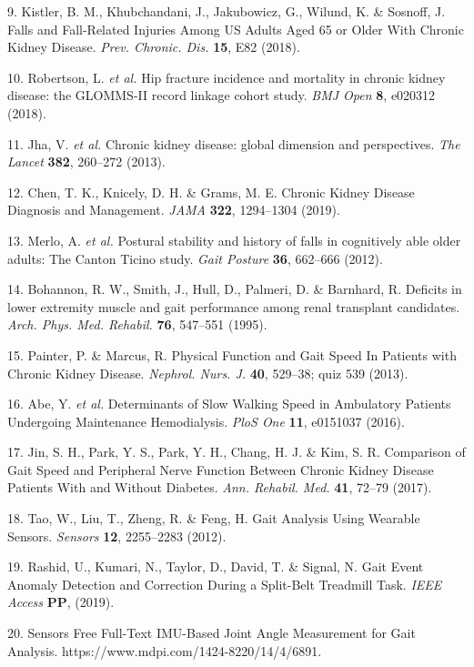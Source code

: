 \documentclass{article}
\begin{document}
9. Kistler, B. M., Khubchandani, J., Jakubowicz, G., Wilund, K. \&
Sosnoff, J. Falls and Fall-Related Injuries Among US Adults Aged 65 or
Older With Chronic Kidney Disease. \emph{Prev. Chronic. Dis.}
\textbf{15}, E82 (2018).

10. Robertson, L. \emph{et al.} Hip fracture incidence and mortality in
chronic kidney disease: the GLOMMS-II record linkage cohort study.
\emph{BMJ Open} \textbf{8}, e020312 (2018).

11. Jha, V. \emph{et al.} Chronic kidney disease: global dimension and
perspectives. \emph{The Lancet} \textbf{382}, 260--272 (2013).

12. Chen, T. K., Knicely, D. H. \& Grams, M. E. Chronic Kidney Disease
Diagnosis and Management. \emph{JAMA} \textbf{322}, 1294--1304 (2019).

13. Merlo, A. \emph{et al.} Postural stability and history of falls in
cognitively able older adults: The Canton Ticino study. \emph{Gait
Posture} \textbf{36}, 662--666 (2012).

14. Bohannon, R. W., Smith, J., Hull, D., Palmeri, D. \& Barnhard, R.
Deficits in lower extremity muscle and gait performance among renal
transplant candidates. \emph{Arch. Phys. Med. Rehabil.} \textbf{76},
547--551 (1995).

15. Painter, P. \& Marcus, R. Physical Function and Gait Speed In
Patients with Chronic Kidney Disease. \emph{Nephrol. Nurs. J.}
\textbf{40}, 529--38; quiz 539 (2013).

16. Abe, Y. \emph{et al.} Determinants of Slow Walking Speed in
Ambulatory Patients Undergoing Maintenance Hemodialysis. \emph{PloS One}
\textbf{11}, e0151037 (2016).

17. Jin, S. H., Park, Y. S., Park, Y. H., Chang, H. J. \& Kim, S. R.
Comparison of Gait Speed and Peripheral Nerve Function Between Chronic
Kidney Disease Patients With and Without Diabetes. \emph{Ann. Rehabil.
Med.} \textbf{41}, 72--79 (2017).

18. Tao, W., Liu, T., Zheng, R. \& Feng, H. Gait Analysis Using Wearable
Sensors. \emph{Sensors} \textbf{12}, 2255--2283 (2012).

19. Rashid, U., Kumari, N., Taylor, D., David, T. \& Signal, N. Gait
Event Anomaly Detection and Correction During a Split-Belt Treadmill
Task. \emph{IEEE Access} \textbf{PP}, (2019).

20. Sensors \textbar{} Free Full-Text \textbar{} IMU-Based Joint Angle
Measurement for Gait Analysis. https://www.mdpi.com/1424-8220/14/4/6891.
\end{document}
